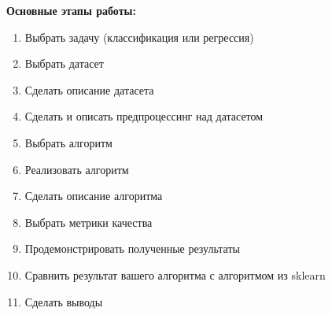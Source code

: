 
\textbf{Основные этапы работы:}
\begin{enumerate}
    \item Выбрать задачу (классификация или регрессия)
    \item Выбрать датасет
    \item Сделать описание датасета
    \item Сделать и описать предпроцессинг над датасетом
    \item Выбрать алгоритм
    \item Реализовать алгоритм
    \item Сделать описание алгоритма
    \item Выбрать метрики качества
    \item Продемонстрировать полученные результаты
    \item Сравнить результат вашего алгоритма с алгоритмом из sklearn
    \item Сделать выводы
\end{enumerate}

\pagebreak
